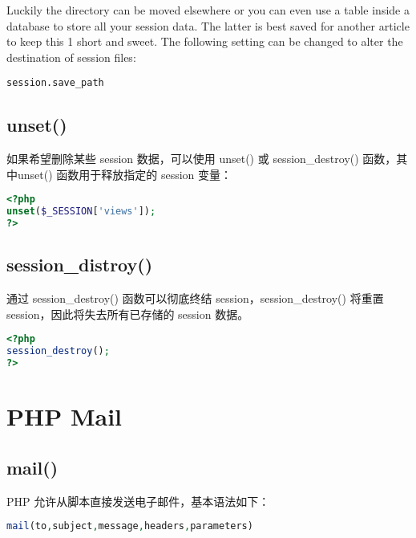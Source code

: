 Luckily the directory can be moved elsewhere or you can even use a table inside a database to store all your session data. The latter is best saved for another article to keep this 1 short and sweet. The following setting can be changed to alter the destination of session files:

\verb|session.save_path|

\section{unset()}

如果希望删除某些 session 数据，可以使用 unset() 或 session\_destroy() 函数，其中unset() 函数用于释放指定的 session 变量：


\begin{lstlisting}[language=PHP]
<?php
unset($_SESSION['views']);
?>
\end{lstlisting}



\section{session\_distroy()}




通过 session\_destroy() 函数可以彻底终结 session，session\_destroy() 将重置 session，因此将失去所有已存储的 session 数据。


\begin{lstlisting}[language=PHP]
<?php
session_destroy();
?>
\end{lstlisting}












\chapter{PHP Mail}






\section{mail()}


PHP 允许从脚本直接发送电子邮件，基本语法如下：

\begin{lstlisting}[language=PHP]
mail(to,subject,message,headers,parameters)
\end{lstlisting}




